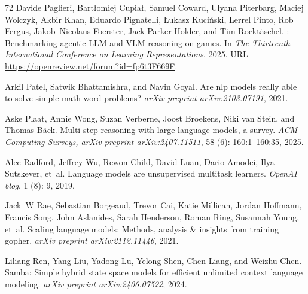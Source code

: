 \begin{thebibliography}{72}
Davide Paglieri, Bart{\l}omiej Cupia{\l}, Samuel Coward, Ulyana Piterbarg, Maciej Wolczyk, Akbir Khan, Eduardo Pignatelli, {\L}ukasz Kuci{\'n}ski, Lerrel Pinto, Rob Fergus, Jakob~Nicolaus Foerster, Jack Parker-Holder, and Tim Rockt{\"a}schel.
: Benchmarking agentic {LLM} and {VLM} reasoning on games.
\newblock In \emph{The Thirteenth International Conference on Learning Representations}, 2025.
\newblock URL \url{https://openreview.net/forum?id=fp6t3F669F}.

Arkil Patel, Satwik Bhattamishra, and Navin Goyal.
\newblock Are nlp models really able to solve simple math word problems?
\newblock \emph{arXiv preprint arXiv:2103.07191}, 2021.

Aske Plaat, Annie Wong, Suzan Verberne, Joost Broekens, Niki van Stein, and Thomas B\"ack.
\newblock Multi-step reasoning with large language models, a survey.
\newblock \emph{ACM Computing Surveys, arXiv preprint arXiv:2407.11511}, 58 (6): 160:1--160:35, 2025.

Alec Radford, Jeffrey Wu, Rewon Child, David Luan, Dario Amodei, Ilya Sutskever, et~al.
\newblock Language models are unsupervised multitask learners.
\newblock \emph{OpenAI blog}, 1 (8): 9, 2019.

Jack~W Rae, Sebastian Borgeaud, Trevor Cai, Katie Millican, Jordan Hoffmann, Francis Song, John Aslanides, Sarah Henderson, Roman Ring, Susannah Young, et~al.
\newblock Scaling language models: Methods, analysis \& insights from training gopher.
\newblock \emph{arXiv preprint arXiv:2112.11446}, 2021.

Liliang Ren, Yang Liu, Yadong Lu, Yelong Shen, Chen Liang, and Weizhu Chen.
\newblock Samba: Simple hybrid state space models for efficient unlimited context language modeling.
\newblock \emph{arXiv preprint arXiv:2406.07522}, 2024.


\end{thebibliography}
